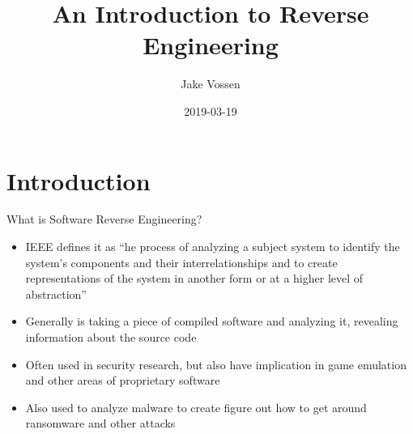 \documentclass{beamer}
\title[Ghidra]{An Introduction to Reverse Engineering}
\author{Jake Vossen}
\institute{Colorado School of Mines - oresec}
\date{2019-03-19}
\begin{document}
\begin{frame}
  \titlepage
\end{frame}


\section{Introduction}

\begin{frame}{What is Software Reverse Engineering?}

\begin{itemize}
  \item IEEE defines it as ``he process of analyzing a subject system to identify the system's components and their interrelationships and to create representations of the system in another form or at a higher level of abstraction''
  \item Generally is taking a piece of compiled software and analyzing
    it, revealing information about the source code
  \item Often used in security research, but also have implication in
    game emulation and other areas of proprietary software
  \item Also used to analyze malware to create figure out how to get
    around ransomware and other attacks
\end{itemize}

\vskip 1cm

\end{frame}
\end{document}
